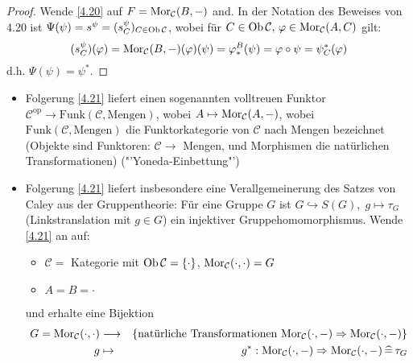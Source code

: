\begin{proof}
	Wende \ref{4.20} auf $F= \text{Mor}_{\mathcal{C}}(B,-)$ and. In der Notation des Beweises von 4.20 ist $\Psi(\psi) = s^\psi = (s_C^\psi)_{C\in \text{Ob}\,\mathcal{C}}$, wobei für $C\in \text{Ob}\,\mathcal{C}, \, \varphi \in \text{Mor}_{\mathcal{C}}(A,C)$ gilt: 
	$$(s_C^\psi)(\varphi) = \text{Mor}_{\mathcal{C}}(B,-)(\varphi)(\psi) = \varphi_*^B(\psi) = \varphi \circ \psi = \psi^*_C(\varphi)$$
	d.h. $\Psi(\psi) = \psi^*$.
\end{proof}
\begin{anm}
	\begin{itemize}
		\item Folgerung \ref{4.21} liefert einen sogenannten volltreuen Funktor $\mathcal{C}^\text{op} \to \text{Funk}(\mathcal{C}, \text{Mengen})$, wobei $A\mapsto \text{Mor}_{\mathcal{C}}(A,-)$, wobei $\text{Funk}(\mathcal{C}, \text{Mengen})$ die Funktorkategorie von $\mathcal{C}$ nach Mengen bezeichnet (Objekte sind Funktoren: $\mathcal{C} \to $ Mengen, und Morphismen die natürlichen Transformationen) ("'Yoneda-Einbettung"')
		\item Folgerung \ref{4.21} liefert insbesondere eine Verallgemeinerung des Satzes von Caley aus der Gruppentheorie: Für eine Gruppe $G$ ist $G \hookrightarrow S(G), \; g \mapsto \tau_G$ (Linkstranslation mit $g\in G$) ein injektiver Gruppehomomorphismus. Wende \ref{4.21} an auf: \begin{itemize}
			\item $\mathcal{C} = $ Kategorie mit $\text{Ob}\,\mathcal{C} = \{ \cdot  \}$, $\text{Mor}_{\mathcal{C}}( \cdot , \cdot ) = G$
			\item $A=B= \cdot $
		\end{itemize}
	und erhalte eine Bijektion 
	\begin{eqnarray*}
		G= \text{Mor}_{\mathcal{C}}( \cdot, \cdot )  & \longrightarrow & \{\text{natürliche Transformationen } \text{Mor}_{\mathcal{C}}( \cdot, -)  \Rightarrow \text{Mor}_{\mathcal{C}}(\cdot, -) \}\\
		g & \mapsto & g^*: \text{Mor}_{\mathcal{C}}( \cdot, -) \Rightarrow \text{Mor}_{\mathcal{C}}( \cdot, -) \, \widehat{=} \, \tau_G
	\end{eqnarray*}
	\end{itemize}
\end{anm}
\newpage
